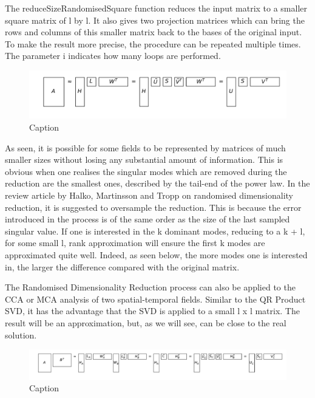 \documentclass{acm_proc_article-sp}
\begin{document}
The reduceSizeRandomisedSquare function reduces the input matrix to a smaller square matrix of l by l. It also gives two projection matrices which can bring the rows and columns of this smaller matrix back to the bases of the original input. To make the result more precise, the procedure can be repeated multiple times. The parameter i indicates how many loops are performed.

\begin{figure}[h]
\begin{center}
\includegraphics[scale=0.3]{Results/reduceSizeRandomisedSquare.pdf}
\caption[Small caption]{Caption}
\label{fig:reduceSizeRandomisedSquare}
\end{center}
\end{figure}

As seen, it is possible for some fields to be represented by matrices of much smaller sizes without losing any substantial amount of information. This is obvious when one realises the singular modes which are removed during the reduction are the smallest ones, described by the tail-end of the power law. In the review article by Halko, Martinsson and Tropp on randomised dimensionality reduction, it is suggested to oversample the reduction. This is because the error introduced in the process is of the same order as the size of the last sampled singular value. If one is interested in the k dominant modes, reducing to a k + l, for some small l, rank approximation will ensure the first k modes are approximated quite well. Indeed, as seen below, the more modes one is interested in, the larger the difference compared with the original matrix.

The Randomised Dimensionality Reduction process can also be applied to the CCA or MCA analysis of two spatial-temporal fields. Similar to the QR Product SVD, it has the advantage that the SVD is applied to a small l x l matrix. The result will be an approximation, but, as we will see, can be close to the real solution.

\begin{figure}[h]
\begin{center}
\includegraphics[scale=0.22]{Results/randomisedSquareProductSVD.pdf}
\caption[Small caption]{Caption}
\label{fig:randomisedSquareProductSVD}
\end{center}
\end{figure}
\end{document}
